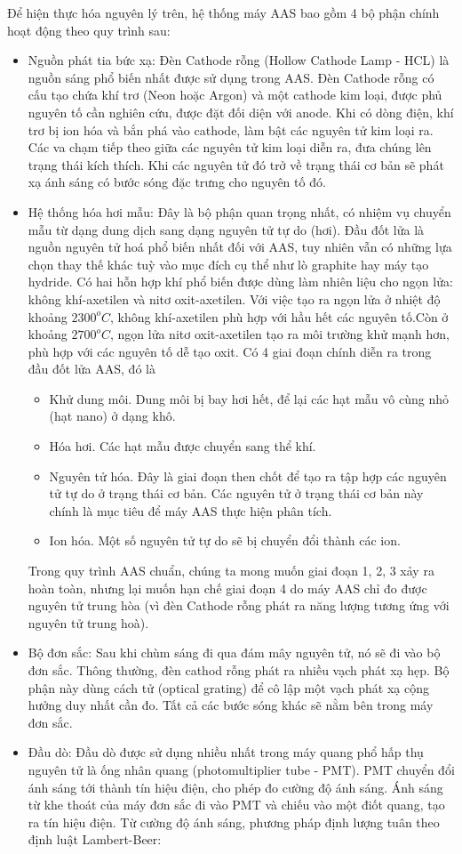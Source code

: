 \documentclass{article} %
\begin{document}
Để hiện thực hóa nguyên lý trên, hệ thống máy AAS bao gồm 4 bộ phận chính hoạt động theo quy trình sau:
\begin{itemize}
    \item Nguồn phát tia bức xạ: Đèn Cathode rỗng (Hollow Cathode Lamp - HCL) là nguồn sáng phổ biến nhất được sử dụng trong AAS. Đèn Cathode rỗng có cấu tạo chứa khí trơ (Neon hoặc Argon) và một cathode kim loại, được phủ nguyên tố cần nghiên cứu, được đặt đối diện với anode. Khi có dòng điện, khí trơ bị ion hóa và bắn phá vào cathode, làm bật các nguyên tử kim loại ra. Các va chạm tiếp theo giữa các nguyên tử kim loại diễn ra, đưa chúng lên trạng thái kích thích. Khi các nguyên tử đó trở về trạng thái cơ bản sẽ phát xạ ánh sáng có bước sóng đặc trưng cho nguyên tố đó.
    \item Hệ thống hóa hơi mẫu: Đây là bộ phận quan trọng nhất, có nhiệm vụ chuyển mẫu từ dạng dung dịch sang dạng nguyên tử tự do (hơi). Đầu đốt lửa là nguồn nguyên tử hoá phổ biến nhất đối với AAS, tuy nhiên vẫn có những lựa chọn thay thế khác tuỳ vào mục đích cụ thể như lò graphite hay máy tạo hydride. Có hai hỗn hợp khí phổ biến được dùng làm nhiên liệu cho ngọn lửa: không khí-axetilen và nitơ oxit-axetilen. Với việc tạo ra ngọn lửa ở nhiệt độ khoảng $2300^oC$, không khí-axetilen phù hợp với hầu hết các nguyên tố.Còn ở khoảng $2700^oC$, ngọn lửa nitơ oxit-axetilen tạo ra môi trường khử mạnh hơn, phù hợp với các nguyên tố dễ tạo oxit. Có 4 giai đoạn chính diễn ra trong đầu đốt lửa AAS, đó là
    \begin{itemize}
        \item Khử dung môi. Dung môi bị bay hơi hết, để lại các hạt mẫu vô cùng nhỏ (hạt nano) ở dạng khô.
        \item Hóa hơi. Các hạt mẫu được chuyển sang thể khí.
        \item Nguyên tử hóa. Đây là giai đoạn then chốt để tạo ra tập hợp các nguyên tử tự do ở trạng thái cơ bản. Các nguyên tử ở trạng thái cơ bản này chính là mục tiêu để máy AAS thực hiện phân tích.
        \item Ion hóa. Một số nguyên tử tự do sẽ bị chuyển đổi thành các ion.
    \end{itemize}
    Trong quy trình AAS chuẩn, chúng ta mong muốn giai đoạn 1, 2, 3 xảy ra hoàn toàn, nhưng lại muốn hạn chế giai đoạn 4 do máy AAS chỉ đo được nguyên tử trung hòa (vì đèn Cathode rỗng phát ra năng lượng tương ứng với nguyên tử trung hoà).
    \item Bộ đơn sắc: Sau khi chùm sáng đi qua đám mây nguyên tử, nó sẽ đi vào bộ đơn sắc. Thông thường, đèn cathod rỗng phát ra nhiều vạch phát xạ hẹp. Bộ phận này dùng cách tử (optical grating) để cô lập một vạch phát xạ cộng hưởng duy nhất cần đo. Tất cả các bước sóng khác sẽ nằm bên trong máy đơn sắc.
    \item Đầu dò: Đầu dò được sử dụng nhiều nhất trong máy quang phổ hấp thụ nguyên tử là ống nhân quang (photomultiplier tube - PMT). PMT chuyển đổi ánh sáng tới thành tín hiệu điện, cho phép đo cường độ ánh sáng. Ánh sáng từ khe thoát của máy đơn sắc đi vào PMT và chiếu vào một điốt quang, tạo ra tín hiệu điện. Từ cường độ ánh sáng, phương pháp định lượng tuân theo định luật Lambert-Beer:
    

\end{itemize}
\end{document}
